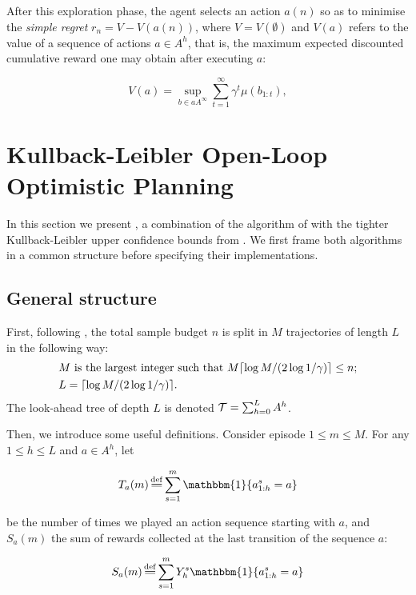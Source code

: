 \documentclass[runningheads, envcountsame, a4paper]{llncs}
\newcommand{\citep}{\cite}
\begin{document}
After this exploration phase, the agent selects an action $a(n)$ so as to minimise the \emph{simple regret} $r_n = V - V(a(n))$, where $V=V(\emptyset)$ and $V(a)$ refers to the value of a sequence of actions $a\in A^h$, that is, the maximum expected discounted cumulative reward one may obtain after executing $a$:


\begin{equation}
\label{eq:value}
V(a) = \sup_{b\in aA^\infty} \sum_{t=1}^\infty \gamma^t\mu(b_{1:t}),
\end{equation}


\section{Kullback-Leibler Open-Loop Optimistic Planning}
\label{sec:kl-olop}

In this section we present \KLOLOP, a combination of the \OLOP algorithm of \citep{Bubeck2010} with the tighter Kullback-Leibler upper confidence bounds from \citep{Cappe2013}. We first frame both algorithms in a common structure before specifying their implementations.

\subsection{General structure}

First, following \OLOP, the total sample budget $n$ is split in $M$ trajectories of length $L$ in the following way: 
\begin{align*}
    &M\text{ is the largest integer such that } M \lceil\log M/(2 \log 1/\gamma)\rceil \leq n;\\
    &L= \lceil\log M / (2 \log 1/\gamma)\rceil.
\end{align*}
The look-ahead tree of depth $L$ is denoted $\mathcal{T} = \sum_{h=0}^L A^h$.

Then, we introduce some useful definitions. Consider episode $1 \leq m \leq M$. For any $1 \leq h \leq L$ and $a\in A^h$, let 


\begin{equation*}
    T_a(m) \eqdef \sum_{s=1}^m \mathbbm{1}\{a^s_{1:h} = a\}
\end{equation*}


\noindent
be the number of times we played an action sequence starting with $a$, and $S_a(m)$ the sum of rewards collected at the last transition of the sequence $a$:


\begin{equation*}
    S_a(m) \eqdef \sum_{s=1}^m Y^s_h \mathbbm{1}\{a^s_{1:h} = a\}
\end{equation*}
\end{document}

